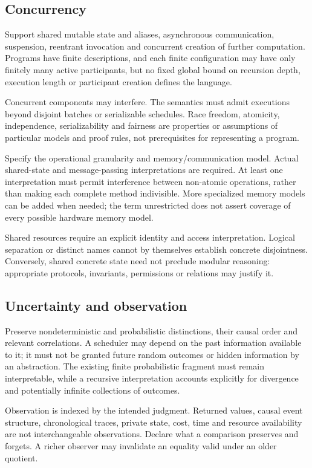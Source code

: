 \documentclass[11pt,a4paper]{article}
\begin{document}
\subsection{Concurrency}
Support shared mutable state and aliases, asynchronous communication, suspension, reentrant invocation and concurrent creation of further computation. Programs have finite descriptions, and each finite configuration may have only finitely many active participants, but no fixed global bound on recursion depth, execution length or participant creation defines the language.

Concurrent components may interfere. The semantics must admit executions beyond disjoint batches or serializable schedules. Race freedom, atomicity, independence, serializability and fairness are properties or assumptions of particular models and proof rules, not prerequisites for representing a program.

Specify the operational granularity and memory/communication model. Actual shared-state and message-passing interpretations are required. At least one interpretation must permit interference between non-atomic operations, rather than making each complete method indivisible. More specialized memory models can be added when needed; the term unrestricted does not assert coverage of every possible hardware memory model.

Shared resources require an explicit identity and access interpretation. Logical separation or distinct names cannot by themselves establish concrete disjointness. Conversely, shared concrete state need not preclude modular reasoning: appropriate protocols, invariants, permissions or relations may justify it.

\subsection{Uncertainty and observation}
Preserve nondeterministic and probabilistic distinctions, their causal order and relevant correlations. A scheduler may depend on the past information available to it; it must not be granted future random outcomes or hidden information by an abstraction. The existing finite probabilistic fragment must remain interpretable, while a recursive interpretation accounts explicitly for divergence and potentially infinite collections of outcomes.

Observation is indexed by the intended judgment. Returned values, causal event structure, chronological traces, private state, cost, time and resource availability are not interchangeable observations. Declare what a comparison preserves and forgets. A richer observer may invalidate an equality valid under an older quotient.
\end{document}
